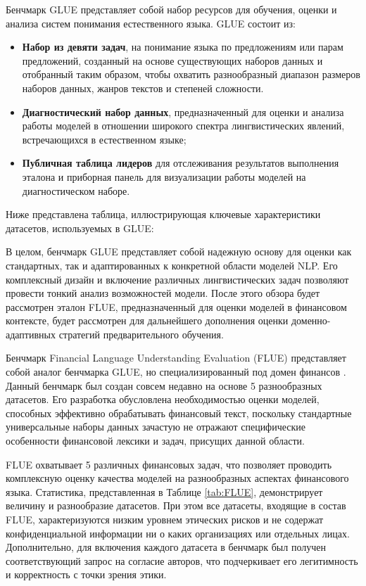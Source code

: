 Бенчмарк GLUE представляет собой набор ресурсов для обучения, оценки и анализа систем понимания естественного языка.
GLUE состоит из:

\begin{itemize}
    \item \textbf{Набор из девяти задач}, на понимание языка по предложениям или парам предложений, созданный на основе
    существующих наборов данных и отобранный таким образом, чтобы охватить разнообразный диапазон размеров наборов
    данных, жанров текстов и степеней сложности.
    \item \textbf{Диагностический набор данных}, предназначенный для оценки и анализа работы моделей в отношении
    широкого спектра лингвистических явлений, встречающихся в естественном языке;
    \item \textbf{Публичная таблица лидеров} для отслеживания результатов выполнения эталона и приборная панель
    для визуализации работы моделей на диагностическом наборе.
\end{itemize}

Ниже представлена таблица, иллюстрирующая ключевые характеристики датасетов, используемых в GLUE:



В целом, бенчмарк GLUE представляет собой надежную основу для оценки как стандартных, так и адаптированных к конкретной области моделей NLP.
Его комплексный дизайн и включение различных лингвистических задач позволяют провести тонкий анализ возможностей модели.
После этого обзора будет рассмотрен эталон FLUE, предназначенный для оценки моделей в финансовом контексте,
будет рассмотрен для дальнейшего дополнения оценки доменно-адаптивных стратегий предварительного обучения.

Бенчмарк Financial Language Understanding Evaluation (FLUE) представляет собой аналог бенчмарка GLUE, но специализированный
под домен финансов \parencite{FLANG2022FLUE}. Данный бенчмарк был создан совсем недавно на основе 5 разнообразных датасетов.
Его разработка обусловлена необходимостью оценки моделей, способных эффективно обрабатывать финансовый текст, поскольку
стандартные универсальные наборы данных зачастую не отражают специфические особенности финансовой лексики и задач,
присущих данной области.



FLUE охватывает 5 различных финансовых задач, что позволяет проводить комплексную оценку качества моделей на разнообразных
аспектах финансового языка. Статистика, представленная в Таблице \ref{tab:FLUE}, демонстрирует величину и разнообразие датасетов.
При этом все датасеты, входящие в состав FLUE, характеризуются низким уровнем этических рисков и не содержат конфиденциальной
информации ни о каких организациях или отдельных лицах. Дополнительно, для включения каждого датасета в бенчмарк был получен
соответствующий запрос на согласие авторов, что подчеркивает его легитимность и корректность с точки зрения этики.

